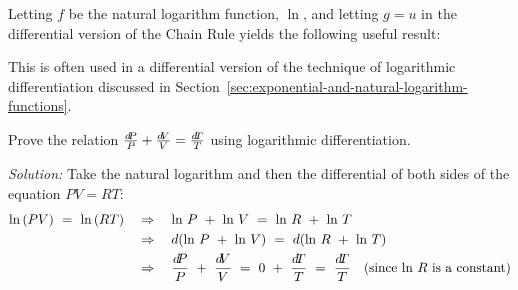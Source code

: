 Letting $f$ be the natural logarithm function, $\ln$, and letting $g = u$ in the
differential version of the Chain Rule yields the following useful result:

This is often used in a differential version of the technique of logarithmic
differentiation discussed in Section~\ref{sec:exponential-and-natural-logarithm-functions}.

\begin{exmp}\label{exmp:diff3}
\noindent Prove the relation $\frac{d\negmedspace P}{P} + \frac{d\negmedspace V}{V} = \frac{d\negmedspace T}{T}$
using logarithmic differentiation.\vspace{1mm}
\par\noindent\emph{Solution:} Take the natural logarithm and then the differential
of both sides of the equation $PV = RT$:
\begin{align*}
\ln\,(PV) ~=~ \ln\,(RT) \quad&\Rightarrow\quad
\ln\,P ~+~ \ln\,V ~=~ \ln\,R ~+~ \ln\,T\\
&\Rightarrow\quad d(\ln\,P ~+~ \ln\,V) ~=~ d(\ln\,R ~+~ \ln\,T)\\
&\Rightarrow\quad \frac{d\negmedspace P}{P} ~+~ \frac{d\negmedspace V}{V} ~=~ 0 ~+~ \frac{d\negmedspace T}{T} ~=~ \frac{d\negmedspace T}{T}
\quad\text{(since $\ln\,R$ is a constant)}
\end{align*}
\end{exmp}

